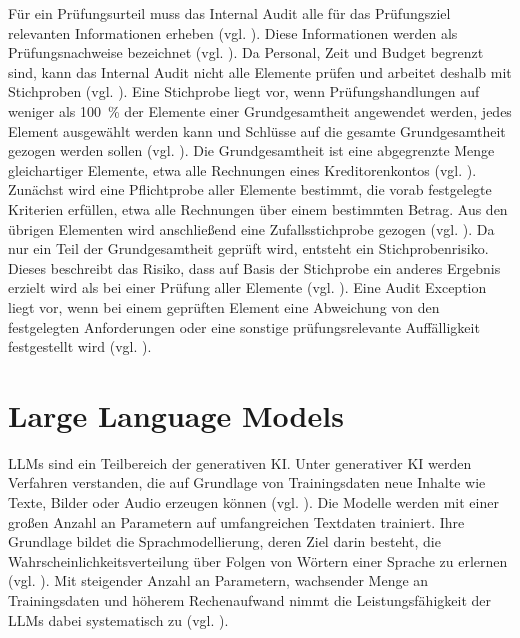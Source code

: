 Für ein Prüfungsurteil muss das Internal Audit alle für das Prüfungsziel relevanten Informationen erheben (vgl. \cite[S.~104]{IIA2024}). Diese Informationen werden als Prüfungsnachweise bezeichnet (vgl. \cite[S.~5]{isa500}). Da Personal, Zeit und Budget begrenzt sind, kann das Internal Audit nicht alle Elemente prüfen und arbeitet deshalb mit Stichproben (vgl. \cite[S.~72]{vandernest2015sampling}). Eine Stichprobe liegt vor, wenn Prüfungshandlungen auf weniger als 100~\% der Elemente einer Grundgesamtheit angewendet werden, jedes Element ausgewählt werden kann und Schlüsse auf die gesamte Grundgesamtheit gezogen werden sollen (vgl. \cite[S.~12]{isa530}). Die Grundgesamtheit ist eine abgegrenzte Menge gleichartiger Elemente, etwa alle Rechnungen eines Kreditorenkontos (vgl. \cite[S.~12]{baumeister2019sample}). Zunächst wird eine Pflichtprobe aller Elemente bestimmt, die vorab festgelegte Kriterien erfüllen, etwa alle Rechnungen über einem bestimmten Betrag. Aus den übrigen Elementen wird anschließend eine Zufallsstichprobe gezogen (vgl. \cite{freudenberg2026auditsample}). Da nur ein Teil der Grundgesamtheit geprüft wird, entsteht ein Stichprobenrisiko. Dieses beschreibt das Risiko, dass auf Basis der Stichprobe ein anderes Ergebnis erzielt wird als bei einer Prüfung aller Elemente (vgl. \cite[S.~21]{isa530}). Eine Audit Exception liegt vor, wenn bei einem geprüften Element eine Abweichung von den festgelegten Anforderungen oder eine sonstige prüfungsrelevante Auffälligkeit festgestellt wird (vgl. \cite[S.~11]{IIA2024}).

\section{Large Language Models}
\label{sec:llm}

\acp{LLM} sind ein Teilbereich der generativen \ac{KI}. Unter generativer \ac{KI} werden Verfahren verstanden, die auf Grundlage von Trainingsdaten neue Inhalte wie Texte, Bilder oder Audio erzeugen können (vgl. \cite[S.~111]{Feuerriegel2024GenerativeAI}). Die Modelle werden mit einer großen Anzahl an Parametern auf umfangreichen Textdaten trainiert. Ihre Grundlage bildet die Sprachmodellierung, deren Ziel darin besteht, die Wahrscheinlichkeitsverteilung über Folgen von Wörtern einer Sprache zu erlernen (vgl. \cite[S.~1]{zhao2023survey}). Mit steigender Anzahl an Parametern, wachsender Menge an Trainingsdaten und höherem Rechenaufwand nimmt die Leistungsfähigkeit der \acp{LLM} dabei systematisch zu (vgl. \cite[S.~3]{kaplan2020scaling}).

